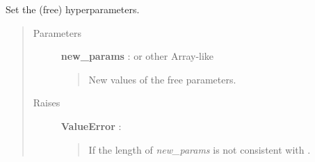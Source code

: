 \documentclass[letterpaper,10pt,english]{sphinxmanual}
\begin{document}
\begin{fulllineitems}

\begin{fulllineitems}
\label{gptools.kernel:gptools.kernel.warping.WarpedKernel.free_params}
\end{fulllineitems}


\begin{fulllineitems}
\label{gptools.kernel:gptools.kernel.warping.WarpedKernel.free_param_bounds}
\end{fulllineitems}


\begin{fulllineitems}
\label{gptools.kernel:gptools.kernel.warping.WarpedKernel.free_param_names}
\end{fulllineitems}


\begin{fulllineitems}
\label{gptools.kernel:gptools.kernel.warping.WarpedKernel.set_hyperparams}
Set the (free) hyperparameters.
\begin{quote}\begin{description}
\item[{Parameters}] \leavevmode
\textbf{new\_params} :  or other Array-like
\begin{quote}

New values of the free parameters.
\end{quote}

\item[{Raises}] \leavevmode
\textbf{ValueError} :
\begin{quote}

If the length of \emph{new\_params} is not consistent with .
\end{quote}

\end{description}\end{quote}

\end{fulllineitems}


\end{fulllineitems}
\end{document}
